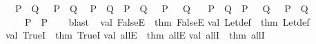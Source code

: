 \begin{isabellebody}
\ \ {\isachardoublequoteopen}{\isacharparenleft}{\kern0pt}P\ {\isasymlongrightarrow}\ Q{\isacharparenright}{\kern0pt}\ {\isacharequal}{\kern0pt}\ {\isacharparenleft}{\kern0pt}{\isasymnot}\ P\ {\isasymor}\ Q{\isacharparenright}{\kern0pt}{\isachardoublequoteclose}\isanewline
\ \ {\isachardoublequoteopen}{\isacharparenleft}{\kern0pt}P\ {\isacharequal}{\kern0pt}\ Q{\isacharparenright}{\kern0pt}\ {\isacharequal}{\kern0pt}\ {\isacharparenleft}{\kern0pt}{\isacharparenleft}{\kern0pt}P\ {\isasymand}\ Q{\isacharparenright}{\kern0pt}\ {\isasymor}\ {\isacharparenleft}{\kern0pt}{\isasymnot}\ P\ {\isasymand}\ {\isasymnot}\ Q{\isacharparenright}{\kern0pt}{\isacharparenright}{\kern0pt}{\isachardoublequoteclose}\isanewline
\ \ {\isachardoublequoteopen}{\isacharparenleft}{\kern0pt}{\isasymnot}\ {\isacharparenleft}{\kern0pt}P\ {\isacharequal}{\kern0pt}\ Q{\isacharparenright}{\kern0pt}{\isacharparenright}{\kern0pt}\ {\isacharequal}{\kern0pt}\ {\isacharparenleft}{\kern0pt}{\isacharparenleft}{\kern0pt}P\ {\isasymand}\ {\isasymnot}\ Q{\isacharparenright}{\kern0pt}\ {\isasymor}\ {\isacharparenleft}{\kern0pt}{\isasymnot}\ P\ {\isasymand}\ Q{\isacharparenright}{\kern0pt}{\isacharparenright}{\kern0pt}{\isachardoublequoteclose}\isanewline
\ \ {\isachardoublequoteopen}{\isacharparenleft}{\kern0pt}{\isasymnot}\ {\isasymnot}\ P{\isacharparenright}{\kern0pt}\ {\isacharequal}{\kern0pt}\ P{\isachardoublequoteclose}\isanewline
%
\isadelimproof
\ \ %
\endisadelimproof
%
\isatagproof
{}\isamarkupfalse%
\ blast{\isacharplus}{\kern0pt}%
\endisatagproof
{\isafoldproof}%
%
\isadelimproof
%
\endisadelimproof
%
\isadelimdocument
%
\endisadelimdocument
%
\isatagdocument
%
\isamarkuptrue%
%
\endisatagdocument
{\isafolddocument}%
%
\isadelimdocument
%
\endisadelimdocument
%
\isadelimML
%
\endisadelimML
%
\isatagML
{}\isamarkupfalse%
\ {\isacartoucheopen}\isanewline
val\ FalseE\ {\isacharequal}{\kern0pt}\ {\isacharat}{\kern0pt}{\isacharbraceleft}{\kern0pt}thm\ FalseE{\isacharbraceright}{\kern0pt}\isanewline
val\ Let{\isacharunderscore}{\kern0pt}def\ {\isacharequal}{\kern0pt}\ {\isacharat}{\kern0pt}{\isacharbraceleft}{\kern0pt}thm\ Let{\isacharunderscore}{\kern0pt}def{\isacharbraceright}{\kern0pt}\isanewline
val\ TrueI\ {\isacharequal}{\kern0pt}\ {\isacharat}{\kern0pt}{\isacharbraceleft}{\kern0pt}thm\ TrueI{\isacharbraceright}{\kern0pt}\isanewline
val\ allE\ {\isacharequal}{\kern0pt}\ {\isacharat}{\kern0pt}{\isacharbraceleft}{\kern0pt}thm\ allE{\isacharbraceright}{\kern0pt}\isanewline
val\ allI\ {\isacharequal}{\kern0pt}\ {\isacharat}{\kern0pt}{\isacharbraceleft}{\kern0pt}thm\ allI{\isacharbraceright}{\kern0pt}\isanewline

\end{isabellebody}

